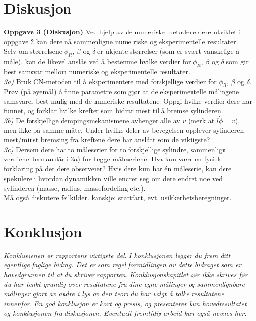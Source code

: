 \documentclass[5p]{elsarticle}
\begin{document}

\section{Diskusjon}
\textbf{Oppgave 3 (Diskusjon)}
Ved hjelp av de numeriske metodene dere utviklet i oppgave 2 kan dere nå sammenligne nume
riske og eksperimentelle resultater. Selv om størrelsene \(\phi_R\), \(\beta\) og \(\delta\) er ukjente størrelser (som er
svært vanskelige å måle), kan de likevel anslås ved å bestemme hvilke verdier for \(\phi_R\), \(\beta\) og \(\delta\) som
gir best samsvar mellom numeriske og eksperimentelle resultater.
\\\textit{3a)} Bruk CN-metoden til å eksperimentere med forskjellige verdier for \(\phi_R\), \(\beta\) og \(\delta\). Prøv (på
øyemål) å finne parametre som gjør at de eksperimentelle målingene samsvarer best mulig med
de numeriske resultatene. Oppgi hvilke verdier dere har funnet, og forklar hvilke krefter som
bidrar mest til å bremse sylinderen.
\\\textit{3b)} De forskjellige dempingsmekanismene avhenger alle av \(v\) (merk at \(l\dot{\phi} = v\)), men ikke på
samme måte. Under hvilke deler av bevegelsen opplever sylinderen mest/minst bremsing fra
kreftene dere har anslått som de viktigste?
\\\textit{3c)} Dersom dere har to måleserier for to forskjellige sylindre, sammenlign verdiene dere anslår
i 3a) for begge måleseriene. Hva kan være en fysisk forklaring på det dere observerer? Hvis dere
kun har én måleserie, kan dere spekulere i hvordan dynamikken ville endret seg om dere endret
noe ved sylinderen (masse, radius, massefordeling etc.).
\\Må også diskutere feilkilder. kanskje: startfart, evt. usikkerhetsberegninger.


\section{Konklusjon}
\textit{
Konklusjonen er rapportens viktigste del. 
I konklusjonen legger du frem ditt egentlige faglige bidrag. 
Det er som regel formidlingen av dette bidraget som er hovedgrunnen til at du skriver rapporten. 
Konklusjonskapitlet bør ikke skrives før du har tenkt grundig over resultatene fra dine egne målinger 
og sammenlignbare målinger gjort av andre i lys av den teori du har valgt å tolke resultatene innenfor.
En god konklusjon er kort og presis, og presenterer kun hovedresultatet og konklusjonen fra diskusjonen. 
Eventuelt fremtidig arbeid kan også nevnes her. 
}
\end{document}
